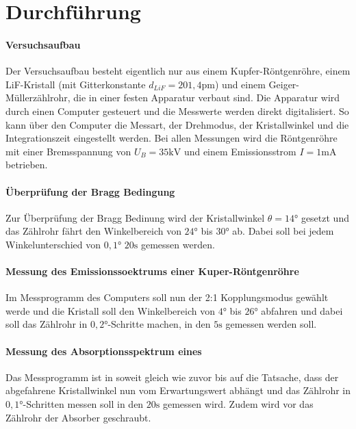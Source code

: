 \section{Durchführung}
\label{sec:Durchführung}
\paragraph{Versuchsaufbau}
Der Versuchsaufbau besteht eigentlich nur aus einem Kupfer-Röntgenröhre,
einem LiF-Kristall (mit Gitterkonstante $d_{LiF} = 201,4 \si{\pico \meter}$)
und einem Geiger-Müllerzählrohr, die in einer festen Apparatur
verbaut sind. Die Apparatur wird durch einen Computer gesteuert und die Messwerte
werden direkt digitalisiert. So kann über den Computer die Messart, der Drehmodus,
der Kristallwinkel und die Integrationszeit eingestellt werden.
Bei allen Messungen wird die Röntgenröhre mit einer Bremsspannung von
$U_B = 35 \si{\kilo \volt} $ und einem Emissionsstrom $I = 1 \si{\milli \ampere}$
betrieben.
\paragraph{Überprüfung der Bragg Bedingung}
Zur Überprüfung der Bragg Bedinung wird der Kristallwinkel $ \theta = 14 \si{\degree}$
gesetzt und das Zählrohr fährt den Winkelbereich von $24 \si{\degree}$ bis
$ 30 \si{\degree} $ ab. Dabei soll bei jedem Winkelunterschied von $ 0,1 \si{\degree}$
$20 \si{\second}$ gemessen werden.
\paragraph{Messung des Emissionssoektrums einer Kuper-Röntgenröhre}
Im Messprogramm des Computers soll nun der 2:1 Kopplungsmodus gewählt werde und
die Kristall soll den Winkelbereich von $4 \si{\degree} $ bis $26 \si{\degree}$
abfahren und dabei soll das Zählrohr in $0,2 \si{\degree}$-Schritte machen,
in den $5\si{\second}$
gemessen werden soll.
\paragraph{Messung des Absorptionsspektrum eines }
Das Messprogramm ist in soweit gleich wie zuvor bis auf die Tatsache, dass
der abgefahrene Kristallwinkel nun vom Erwartungswert abhängt und das Zählrohr
in $0,1 \si{\degree}$-Schritten messen soll in den $ 20 \si{\second}$ gemessen wird.
Zudem wird vor das Zählrohr der Absorber geschraubt.
